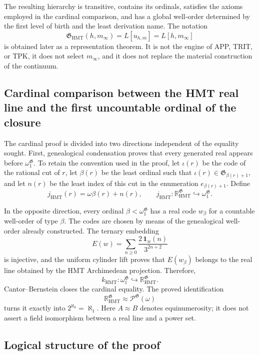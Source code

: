 The resulting hierarchy is transitive, contains its ordinals, satisfies the
axioms employed in the cardinal comparison, and has a global well-order
determined by the first level of birth and the least derivation name. The
notation
\[
 \mathfrak G_{\mathrm{HMT}}(h,m_\infty)
 =L[u_{h,m}]=L[h,m_\infty]
\]
is obtained later as a representation theorem. It is not the engine of APP,
TRIT, or TPK, it does not select \(m_\infty\), and it does not replace the
material construction of the continuum.

\subsection{Cardinal comparison between the HMT real line and the first uncountable ordinal of the closure}

The cardinal proof is divided into two directions independent of the equality
sought. First, genealogical condensation proves that every generated real
appears before \(\omega_1^{\mathfrak G}\). To retain the convention used in
the proof, let \(\iota(r)\) be the code of the rational cut of \(r\), let
\(\beta(r)\) be the least ordinal such that
\(\iota(r)\in\mathfrak G_{\beta(r)+1}\), and let \(n(r)\) be the least index
of this cut in the enumeration \(e_{\beta(r)+1}\). Define
\[
 j_{\mathrm{HMT}}(r)=\omega\beta(r)+n(r),
 \qquad
 j_{\mathrm{HMT}}:
 \mathbb R_{\mathrm{HMT}}^{\mathfrak G}
 \hookrightarrow\omega_1^{\mathfrak G}.
\]

In the opposite direction, every ordinal
\(\beta<\omega_1^{\mathfrak G}\) has a real code \(w_\beta\) for a countable
well-order of type \(\beta\). The codes are chosen by means of the
genealogical well-order already constructed. The ternary embedding
\[
 E(w)=\sum_{n\geq0}\frac{2\,\mathbf 1_w(n)}{3^{2n+2}}
\]
is injective, and the uniform cylinder lift proves that \(E(w_\beta)\) belongs
to the real line obtained by the HMT Archimedean projection. Therefore,
\[
 k_{\mathrm{HMT}}:
 \omega_1^{\mathfrak G}
 \hookrightarrow\mathbb R_{\mathrm{HMT}}^{\mathfrak G}.
\]
Cantor--Bernstein closes the cardinal equality. The proved identification
\[
 \mathbb R_{\mathrm{HMT}}^{\mathfrak G}
 \approx\mathcal P^{\mathfrak G}(\omega)
\]
turns it exactly into \(2^{\aleph_0}=\aleph_1\). Here \(A\approx B\) denotes
equinumerosity; it does not assert a field isomorphism between a real line and
a power set.

\clearpage
\subsection{Logical structure of the proof}

